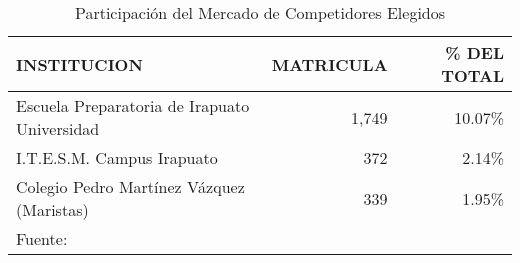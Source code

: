 \begin{table}[t]
    \centering
    \caption{Participaci\'on del Mercado de Competidores Elegidos}
    \label{tbl:SEG:CompetidoresParticipacion}
    \begin{tabular}{l|r|r}
        INSTITUCION                                   & MATRICULA & \% DEL TOTAL \\
        \hline
        \hline
        Escuela Preparatoria de Irapuato Universidad  & 1,749     & 10.07\%      \\
        I.T.E.S.M. Campus Irapuato                    &   372     &  2.14\%      \\
        Colegio Pedro Mart\'inez V\'azquez (Maristas) &   339     &  1.95\%      \\
        \hline
        \multicolumn{3}{l}{Fuente: \citep{Seg2010}}
    \end{tabular}
\end{table}
